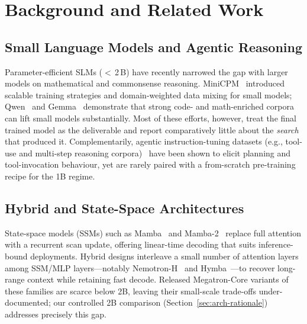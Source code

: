 ﻿\section{Background and Related Work}

\subsection{Small Language Models and Agentic Reasoning}
Parameter-efficient SLMs ($<\,$2\,B) have recently narrowed the gap with larger models on mathematical and commonsense reasoning.
MiniCPM~\cite{minicpm2024} introduced scalable training strategies and domain-weighted data mixing for small models; Qwen~\cite{yang2025qwen3} and Gemma~\cite{gemmateam2025gemma3} demonstrate that strong code- and math-enriched corpora can lift small models substantially.
Most of these efforts, however, treat the final trained model as the deliverable and report comparatively little about the \emph{search} that produced it.
Complementarily, agentic instruction-tuning datasets (e.g., tool-use and multi-step reasoning corpora)~\cite{liu2024agentbench} have been shown to elicit planning and tool-invocation behaviour, yet are rarely paired with a from-scratch pre-training recipe for the 1B regime.

\subsection{Hybrid and State-Space Architectures}
State-space models (SSMs) such as Mamba~\cite{gu2023mamba} and Mamba-2~\cite{dao2024transformers} replace full attention with a recurrent scan update, offering linear-time decoding that suits inference-bound deployments.
Hybrid designs interleave a small number of attention layers among SSM/MLP layers---notably Nemotron-H~\cite{nvidia2025nemotronh} and Hymba~\cite{dong2024hymba}---to recover long-range context while retaining fast decode.
Released Megatron-Core variants of these families are scarce below 2B, leaving their small-scale trade-offs under-documented; our controlled 2B comparison (Section~\ref{sec:arch-rationale}) addresses precisely this gap.

